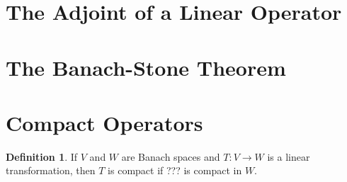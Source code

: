 \documentclass{article}
\theoremstyle{definition}
\newtheorem{definition}{Definition}[section]
\begin{document}
\section{The Adjoint of a Linear Operator}


\section{The Banach-Stone Theorem}



\section{Compact Operators}
\begin{definition}
    If $V$ and $W$ are Banach spaces and $T:V\to W$ is a linear transformation,
    then $T$ is compact if ??? is compact in $W$.
\end{definition}
\end{document}
